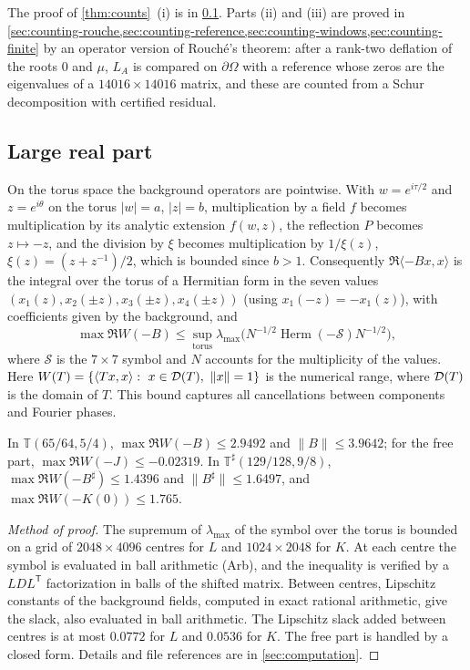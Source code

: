 The proof of \cref{thm:counts}~(i) is in \cref{sec:counting-large}. Parts (ii) and (iii) are proved in
\cref{sec:counting-rouche,sec:counting-reference,sec:counting-windows,sec:counting-finite} by an
operator version of Rouch\'e's theorem: after a rank-two deflation of the roots $0$ and $\mu$, $L_A$ is
compared on $\partial\Omega$ with a reference whose zeros are the eigenvalues of a $14016\times14016$
matrix, and these are counted from a Schur decomposition with certified residual.

\subsection{Large real part}\label{sec:counting-large}

On the torus space the background operators are pointwise. With $w=e^{i\tau/2}$ and $z=e^{i\theta}$ on the
torus $|w|=a$, $|z|=b$, multiplication by a field $f$ becomes multiplication by its analytic extension
$f(w,z)$, the reflection $P$ becomes $z\mapsto-z$, and the division by $\xi$ becomes multiplication by
$1/\xi(z)$, $\xi(z)=(z+z^{-1})/2$, which is bounded since $b>1$. Consequently
$\Re\langle -Bx,x\rangle$ is the integral over the torus of a Hermitian form in the seven values
$(x_1(z),x_2(\pm z),x_3(\pm z),x_4(\pm z))$ (using $x_1(-z)=-x_1(z)$), with coefficients given by the background,
and
\[
  \max\Re W(-B)\le\sup_{\text{torus}}\lambda_{\max}\big(N^{-1/2}\operatorname{Herm}(-\mathcal S)N^{-1/2}\big),
\]
where $\mathcal S$ is the $7\times7$ symbol and $N$ accounts for the multiplicity of the values. Here
$W(T)=\{\langle Tx,x\rangle:\ x\in\Dom(T),\ \|x\|=1\}$ is the numerical range, where $\mathcal{D}(T)$ is the domain
of $T$. This bound captures all cancellations
between components and Fourier phases.

\begin{lemma}\label{lem:F3}
In $\mathbb T(65/64,5/4)$, $\max\Re W(-B)\le2.9492$ and $\|B\|\le3.9642$; for the free part,
$\max\Re W(-J)\le-0.02319$. In $\mathbb T^\sharp(129/128,9/8)$, $\max\Re W(-B^\sharp)\le1.4396$ and
$\|B^\sharp\|\le1.6497$, and $\max\Re W(-K(0))\le 1.765$.
\end{lemma}

\begin{proof}[Method of proof]
The supremum of $\lambda_{\max}$ of the symbol over the torus is bounded on a grid of $2048\times4096$
centres for $L$ and $1024\times2048$ for $K$. At each centre the symbol is evaluated in ball arithmetic (Arb), and the inequality is verified by a
$LDL^{\mathsf T}$ factorization in balls of the shifted matrix. Between centres, Lipschitz constants of the
background fields, computed in exact rational arithmetic, give the slack, also evaluated in ball arithmetic.
The Lipschitz slack added between centres is at most $0.0772$ for $L$ and $0.0536$ for $K$. The free part is handled by a closed
form. Details and file references are in \cref{sec:computation}.
\end{proof}

